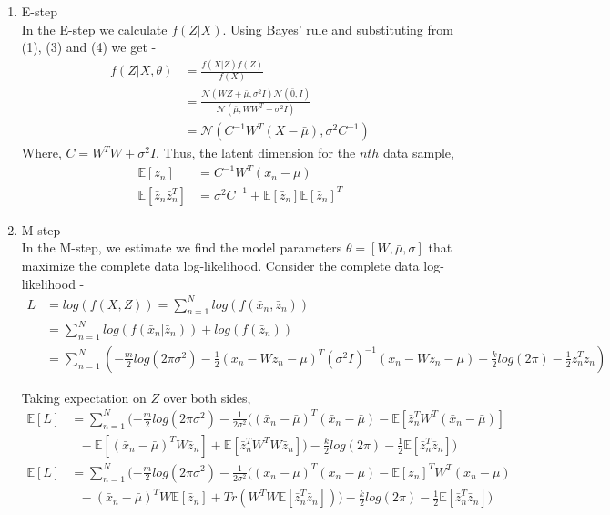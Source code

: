 \begin{enumerate}
	\item E-step \\
	In the E-step we calculate $f(Z|X)$. Using Bayes' rule and substituting from (1), (3) and (4) we get - 
	\begin{align*}
		f(Z|X,\theta) &= \frac{f(X|Z) f(Z)}{f(X)} \\
			&= \frac{\mathcal{N}(WZ + \bar{\mu}, \sigma^2I) \mathcal{N}(\bar{0}, I)}{\mathcal{N}(\bar{\mu}, WW^T + \sigma^2I)} \\
			&= \mathcal{N}(C^{-1}W^T(X - \bar{\mu}), \sigma^2 C^{-1})
	\end{align*}
	Where, $C = W^TW + \sigma^2I$. Thus, the latent dimension for the $n{th}$ data sample, 
	\begin{align}
		\mathbb{E}[\bar{z}_n]  &= C^{-1}W^T(\bar{x}_n - \bar{\mu}) \\
		\mathbb{E}[\bar{z}_n\bar{z}_n^T] &=  \sigma^2 C^{-1} + \mathbb{E}[\bar{z}_n]\mathbb{E}[\bar{z}_n]^T
	\end{align}
	
	\item M-step \\
	In the M-step, we estimate we find the model parameters $\theta = [W, \bar{\mu}, \sigma]$ that maximize the complete data log-likelihood. Consider the complete data log-likelihood - 
	\begin{align*}
		L &= log(f(X, Z)) = \sum_{n = 1}^N log(f(\bar{x}_n, \bar{z}_n)) \\
			&= \sum_{n = 1}^N log(f(\bar{x}_n | \bar{z}_n)) + log(f(\bar{z}_n)) \\
			&= \sum_{n = 1}^N ( -\frac{m}{2}log(2\pi \sigma^2) - \frac{1}{2} (\bar{x}_n - W\bar{z}_n - \bar{\mu})^T (\sigma^2I)^{-1} (\bar{x}_n - W\bar{z}_n - \bar{\mu}) - \frac{k}{2}log(2\pi) - \frac{1}{2} \bar{z}_n^T \bar{z}_n)
	\end{align*}
	
	Taking expectation on $Z$ over both sides,
	\begin{align}
		\mathbb{E}[L] &= \sum_{n = 1}^N ( -\frac{m}{2}log(2\pi \sigma^2) -\frac{1}{2 \sigma^2} ((\bar{x}_n - \bar{\mu})^T (\bar{x}_n -  \bar{\mu}) - \mathbb{E}[\bar{z}_n^TW^T(\bar{x}_n - \bar{\mu})] \nonumber
		\\ & \: \: \: - \mathbb{E}[(\bar{x}_n - \bar{\mu})^TW\bar{z}_n] + \mathbb{E}[\bar{z}_n^TW^TW\bar{z}_n]) - \frac{k}{2}log(2\pi) - \frac{1}{2} \mathbb{E}[\bar{z}_n^T \bar{z}_n])\nonumber \\ 
		\mathbb{E}[L] &= \sum_{n = 1}^N ( -\frac{m}{2}log(2\pi \sigma^2) -\frac{1}{2 \sigma^2} ((\bar{x}_n - \bar{\mu})^T (\bar{x}_n -  \bar{\mu}) - \mathbb{E}[\bar{z}_n]^TW^T(\bar{x}_n - \bar{\mu}) 
		\\ & \: \: \: - (\bar{x}_n - \bar{\mu})^TW\mathbb{E}[\bar{z}_n] + Tr(W^TW \mathbb{E}[\bar{z}_n^T\bar{z}_n])) - \frac{k}{2}log(2\pi) - \frac{1}{2} \mathbb{E}[\bar{z}_n^T \bar{z}_n]) \nonumber
	\end{align}
	

\end{enumerate}
